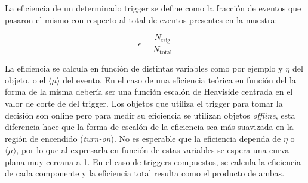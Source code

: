 La eficiencia de un determinado trigger se define como la fracción de eventos que pasaron el mismo con respecto al total de eventos presentes en la muestra:

\begin{equation}
	\epsilon = \frac{N_\text{trig}}{N_\text{total}}
\end{equation}

La eficiencia se calcula en función de distintas variables como por ejemplo \pt y $\eta$ del objeto, o el $\langle\mu\rangle$ del evento. En el caso de una eficiencia teórica en función del \pt la forma de la misma debería ser una función escalón de Heaviside centrada en el valor de corte de \pt del trigger. Los objetos que utiliza el trigger para tomar la decisión son online pero para medir su eficiencia se utilizan objetos \textit{offline}, esta diferencia hace que la forma de escalón de la eficiencia sea más suavizada en la región de encendido (\textit{turn-on}). No es esperable que la eficiencia dependa de $\eta$ o $\langle\mu\rangle$, por lo que al expresarla en función de estas variables se espera una curva plana muy cercana a 1. En el caso de triggers compuestos, se calcula la eficiencia de cada componente y la eficiencia total resulta como el producto de ambas.

